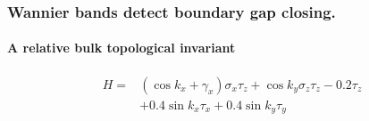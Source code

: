 \documentclass{beamer}
\renewcommand{\(}{\left(}
\renewcommand{\)}{\right)}
\renewcommand{\[}{\left[}
\renewcommand{\]}{\right]}
\begin{document}
\begin{frame}
    \frametitle{Wannier bands detect boundary gap closing.}
    \framesubtitle{A relative bulk topological invariant}
    \begin{align*}
        H= & (\cos k_x+ \gamma_x) \sigma_x\tau_z +  \cos k_y  \sigma_z\tau_z - 0.2 \tau_z \nonumber\\
        &+ 0.4 \sin k_x \tau_x + 0.4 \sin k_y \tau_y
    \end{align*}
    \begin{figure}[t]
        \centering

\end{figure}
\end{frame}
\end{document}

